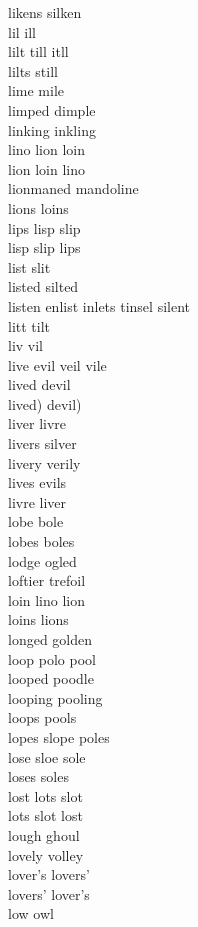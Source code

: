 likens silken\\
lil ill\\
lilt till itll\\
lilts still\\
lime mile\\
limped dimple\\
linking inkling\\
lino lion loin\\
lion loin lino\\
lionmaned mandoline\\
lions loins\\
lips lisp slip\\
lisp slip lips\\
list slit\\
listed silted\\
listen enlist inlets tinsel silent\\
litt tilt\\
liv vil\\
live evil veil vile\\
lived devil\\
lived) devil)\\
liver livre\\
livers silver\\
livery verily\\
lives evils\\
livre liver\\
lobe bole\\
lobes boles\\
lodge ogled\\
loftier trefoil\\
loin lino lion\\
loins lions\\
longed golden\\
loop polo pool\\
looped poodle\\
looping pooling\\
loops pools\\
lopes slope poles\\
lose sloe sole\\
loses soles\\
lost lots slot\\
lots slot lost\\
lough ghoul\\
lovely volley\\
lover's lovers'\\
lovers' lover's\\
low owl\\
